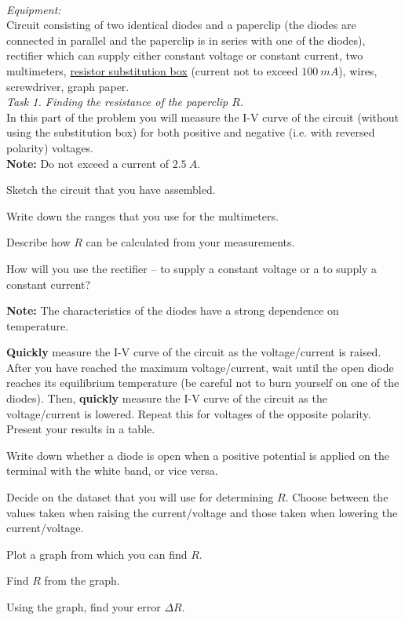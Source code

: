 \documentclass[../TST.tex]{subfiles}
\begin{document}
\begin{eproblem}{\ \\[5pt]}
\textit{Equipment:}\\
Circuit consisting of two identical diodes and a paperclip (the diodes are connected in parallel and the paperclip is in series with one of the diodes), rectifier which can supply either constant voltage or constant current, two multimeters, \href{https://www.nutsvolts.com/magazine/article/September2016_Capacitor-Resistor-Substitution-Boxes}{\color{blue} resistor substitution box} (current not to exceed $\qty{100}{mA}$), wires, screwdriver, graph paper.\\

\textit{Task 1. Finding the resistance of the paperclip $R$.}\\
In this part of the problem you will measure the I-V curve of the circuit (without using the substitution box) for both positive and negative (i.e. with reversed polarity) voltages.\\

\textbf{Note:} Do not exceed a current of $\qty{2.5}{A}$.
\begin{subpart}
	\item Sketch the circuit that you have assembled.
	\item Write down the ranges that you use for the multimeters.
	\item Describe how $R$ can be calculated from your measurements.
	\item How will you use the rectifier -- to supply a constant voltage or a to supply a constant current?
\end{subpart}
\textbf{Note:} The characteristics of the diodes have a strong dependence on temperature.
\begin{subpart}[resume]
	\item \textbf{Quickly} measure the I-V curve of the circuit as the voltage/current is raised. After you have reached the maximum voltage/current, wait until the open diode reaches its equilibrium temperature (be careful not to burn yourself on one of the diodes). Then, \textbf{quickly} measure the I-V curve of the circuit as the voltage/current is lowered. Repeat this for voltages of the opposite polarity. Present your results in a table.
	\item Write down whether a diode is open when a positive potential is applied on the terminal with the white band, or vice versa.
	\item Decide on the dataset that you will use for determining $R$. Choose between the values taken when raising the current/voltage and those taken when lowering the current/voltage.
	\item Plot a graph from which you can find $R$.
	\item Find $R$ from the graph.
	\item Using the graph, find your error $\Delta R$.\\
\end{subpart}


\end{eproblem}
\end{document}
